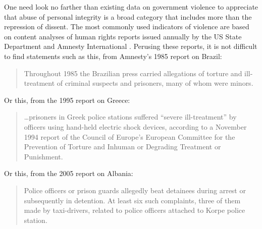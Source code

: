 \documentclass[12pt]{article}
\begin{document}
One need look no farther than existing data on government violence to appreciate that abuse of personal integrity is a broad category that includes more than the repression of dissent. The most commonly used indicators of violence are based on content analyses of human rights reports issued annually by the US State Department and Amnesty International \citep{CIRI2014, PTS2015}. Perusing these reports, it is not difficult to find statements such as this, from Amnesty's 1985 report on Brazil:
\begin{quote} 
Throughout 1985 the Brazilian press carried allegations of torture and ill-treatment of criminal suspects and prisoners, many of whom were minors.
\end{quote} 
Or this, from the 1995 report on Greece:
\begin{quote}
\ldots prisoners in Greek police stations suffered ``severe ill-treatment'' by officers using hand-held electric shock devices, according to a November 1994 report of the Council of Europe's European Committee for the Prevention of Torture and Inhuman or Degrading Treatment or Punishment.
\end{quote} 
Or this, from the 2005 report on Albania: 
\begin{quote}
Police officers or prison guards allegedly beat detainees during arrest or subsequently in detention. At least six such complaints, three of them made by taxi-drivers, related to police officers attached to Korpe police station.
\end{quote}
\end{document}
